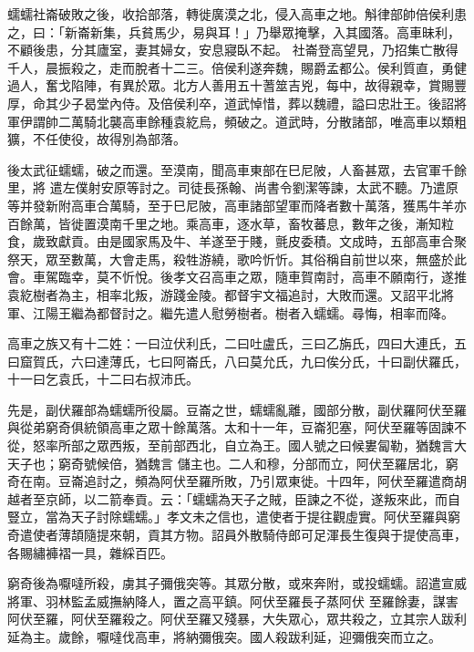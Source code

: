 \begin{pinyinscope}
 蠕蠕社崙破敗之後，收拾部落，轉徙廣漠之北，侵入高車之地。斛律部帥倍侯利患之，曰：「新崙新集，兵貧馬少，易與耳！」乃舉眾掩擊，入其國落。高車昧利，不顧後患，分其廬室，妻其婦女，安息寢臥不起。
 社崙登高望見，乃招集亡散得千人，晨振殺之，走而脫者十二三。倍侯利遂奔魏，賜爵孟都公。侯利質直，勇健過人，奮戈陷陣，有異於眾。北方人善用五十蓍筮吉兇，每中，故得親幸，賞賜豐厚，命其少子曷堂內侍。及倍侯利卒，道武悼惜，葬以魏禮，謚曰忠壯王。後詔將軍伊謂帥二萬騎北襲高車餘種袁紇烏，頻破之。道武時，分散諸部，唯高車以類粗獷，不任使役，故得別為部落。



 後太武征蠕蠕，破之而還。至漠南，聞高車東部在巳尼陂，人畜甚眾，去官軍千餘里，將
 遣左僕射安原等討之。司徒長孫翰、尚書令劉潔等諫，太武不聽。乃遣原等并發新附高車合萬騎，至于巳尼陂，高車諸部望軍而降者數十萬落，獲馬牛羊亦百餘萬，皆徙置漠南千里之地。乘高車，逐水草，畜牧蕃息，數年之後，漸知粒食，歲致獻貢。由是國家馬及牛、羊遂至于賤，氈皮委積。文成時，五部高車合聚祭天，眾至數萬，大會走馬，殺牲游繞，歌吟忻忻。其俗稱自前世以來，無盛於此會。車駕臨幸，莫不忻悅。後孝文召高車之眾，隨車賀南討，高車不願南行，遂推袁紇樹者為主，相率北叛，游踐金陵。都督宇文福追討，大敗而還。又詔平北將
 軍、江陽王繼為都督討之。繼先遣人慰勞樹者。樹者入蠕蠕。尋悔，相率而降。



 高車之族又有十二姓：一曰泣伏利氏，二曰吐盧氏，三曰乙旃氏，四曰大連氏，五曰窟賀氏，六曰達薄氏，七曰阿崙氏，八曰莫允氏，九曰俟分氏，十曰副伏羅氏，十一曰乞袁氏，十二曰右叔沛氏。



 先是，副伏羅部為蠕蠕所役屬。豆崙之世，蠕蠕亂離，國部分散，副伏羅阿伏至羅與從弟窮奇俱統領高車之眾十餘萬落。太和十一年，豆崙犯塞，阿伏至羅等固諫不從，怒率所部之眾西叛，至前部西北，自立為王。國人號之曰候婁匐勒，猶魏言大天子也；窮奇號候倍，猶魏言
 儲主也。二人和穆，分部而立，阿伏至羅居北，窮奇在南。豆崙追討之，頻為阿伏至羅所敗，乃引眾東徙。十四年，阿伏至羅遣商胡越者至京師，以二箭奉貢。云：「蠕蠕為天子之賊，臣諫之不從，遂叛來此，而自豎立，當為天子討除蠕蠕。」孝文未之信也，遣使者于提往觀虛實。阿伏至羅與窮奇遣使者薄頡隨提來朝，貢其方物。詔員外散騎侍郎可足渾長生復與于提使高車，各賜繡褲褶一具，雜綵百匹。



 窮奇後為嚈噠所殺，虜其子彌俄突等。其眾分散，或來奔附，或投蠕蠕。詔遣宣威將軍、羽林監孟威撫納降人，置之高平鎮。阿伏至羅長子蒸阿伏
 至羅餘妻，謀害阿伏至羅，阿伏至羅殺之。阿伏至羅又殘暴，大失眾心，眾共殺之，立其宗人跋利延為主。歲餘，嚈噠伐高車，將納彌俄突。國人殺跋利延，迎彌俄突而立之。




\end{pinyinscope}
